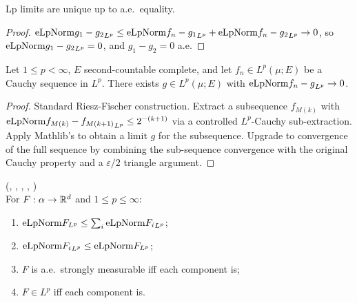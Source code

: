 \begin{theorem}
\label{thm:ae_eq_of_tendsto_eLpNorm_sub}
\leanok
Lp limits are unique up to a.e.\ equality.
\end{theorem}

\begin{proof}
\leanok

$\mathrm{eLpNorm}{g_1 - g_2}_{L^p} \le \mathrm{eLpNorm}{f_n - g_1}_{L^p} +
\mathrm{eLpNorm}{f_n - g_2}_{L^p} \to 0$, so $\mathrm{eLpNorm}{g_1 - g_2}_{L^p} = 0$,
and $g_1 - g_2 = 0$ a.e.
\end{proof}

\begin{theorem}
\label{thm:scalar-cauchy}
\leanok
Let $1 \le p < \infty$, $E$ second-countable complete, and let $f_n \in
L^p(\mu; E)$ be a Cauchy sequence in $L^p$. There exists $g \in L^p(\mu; E)$
with $\mathrm{eLpNorm}{f_n - g}_{L^p}\to 0$.
\end{theorem}

\begin{proof}
\leanok

Standard Riesz-Fischer construction. Extract a subsequence $f_{M(k)}$ with
$\mathrm{eLpNorm}{f_{M(k)} - f_{M(k+1)}}_{L^p} \le 2^{-(k+1)}$ via a controlled
$L^p$-Cauchy sub-extraction. Apply Mathlib's
 to obtain a limit $g$ for the
subsequence. Upgrade to convergence of the full sequence by combining the
sub-sequence convergence with the original Cauchy property and a $\varepsilon/2$
triangle argument.
\end{proof}

\begin{theorem}
\label{thm:eLpNorm_pi_le_sum_component}
\leanok
(,
,
,
,
)\\
For $F : \alpha \to \mathbb{R}^d$ and $1 \le p \le \infty$:
\begin{enumerate}
\item $\mathrm{eLpNorm}{F}_{L^p} \le \sum_i \mathrm{eLpNorm}{F_i}_{L^p}$;
\item $\mathrm{eLpNorm}{F_i}_{L^p} \le \mathrm{eLpNorm}{F}_{L^p}$;
\item $F$ is a.e.\ strongly measurable iff each component is;
\item $F \in L^p$ iff each component is.
\end{enumerate}
\end{theorem}


